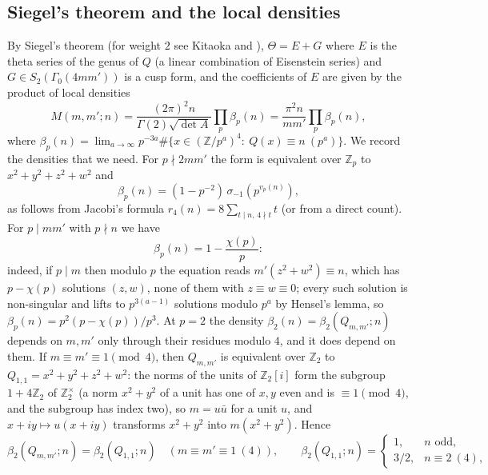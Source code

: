 \documentclass[11pt]{amsart}
\theoremstyle{remark}
\newcommand{\Z}{\mathbb{Z}}
\begin{document}
\subsection{Siegel's theorem and the local densities}
By Siegel's theorem \cite{Siegel} (for weight $2$ see Kitaoka \cite{Kitaoka} and \cite[Section~2]{Waibel}), $\Theta=E+G$ where $E$ is the theta series of the genus of $Q$ (a linear combination of Eisenstein series) and $G\in S_2(\Gamma_0(4mm'))$ is a cusp form, and the coefficients of $E$ are given by the product of local densities \cite[(1)--(2)]{Waibel}
\begin{equation}\label{eq:siegel}
M(m,m';n)=\frac{(2\pi)^2 n}{\Gamma(2)\sqrt{\det A}}\prod_p\beta_p(n)=\frac{\pi^2n}{mm'}\prod_p\beta_p(n),
\end{equation}
where $\beta_p(n)=\lim_{a\to\infty}p^{-3a}\#\{x\in(\Z/p^a)^4:\ Q(x)\equiv n\ (p^a)\}$.
We record the densities that we need. For $p\nmid 2mm'$ the form is equivalent over $\Z_p$ to $x^2+y^2+z^2+w^2$ and
\begin{equation}\label{eq:betagood}
\beta_p(n)=(1-p^{-2})\,\sigma_{-1}(p^{v_p(n)}),
\end{equation}
as follows from Jacobi's formula $r_4(n)=8\sum_{t\mid n,\,4\nmid t}t$ (or from a direct count). For $p\mid mm'$ with $p\nmid n$ we have
\begin{equation}\label{eq:betabad}
\beta_p(n)=1-\frac{\chi(p)}{p}:
\end{equation}
indeed, if $p\mid m$ then modulo $p$ the equation reads $m'(z^2+w^2)\equiv n$, which has $p-\chi(p)$ solutions $(z,w)$, none of them with $z\equiv w\equiv0$; every such solution is non-singular and lifts to $p^{3(a-1)}$ solutions modulo $p^a$ by Hensel's lemma, so $\beta_p(n)=p^2(p-\chi(p))/p^3$. At $p=2$ the density $\beta_2(n)=\beta_2(Q_{m,m'};n)$ depends on $m,m'$ only through their residues modulo $4$, and it does depend on them. If $m\equiv m'\equiv1\pmod4$, then $Q_{m,m'}$ is equivalent over $\Z_2$ to $Q_{1,1}=x^2+y^2+z^2+w^2$: the norms of the units of $\Z_2[i]$ form the subgroup $1+4\Z_2$ of $\Z_2^\times$ (a norm $x^2+y^2$ of a unit has one of $x,y$ even and is $\equiv1\pmod4$, and the subgroup has index two), so $m=u\bar u$ for a unit $u$, and $x+iy\mapsto u(x+iy)$ transforms $x^2+y^2$ into $m(x^2+y^2)$. Hence
\begin{equation}\label{eq:beta2}
\beta_2(Q_{m,m'};n)=\beta_2(Q_{1,1};n)\quad(m\equiv m'\equiv1\ (4)),\qquad
\beta_2(Q_{1,1};n)=\begin{cases}1,& n\text{ odd},\\ 3/2,& n\equiv2\ (4),\end{cases}
\end{equation}
\end{document}
